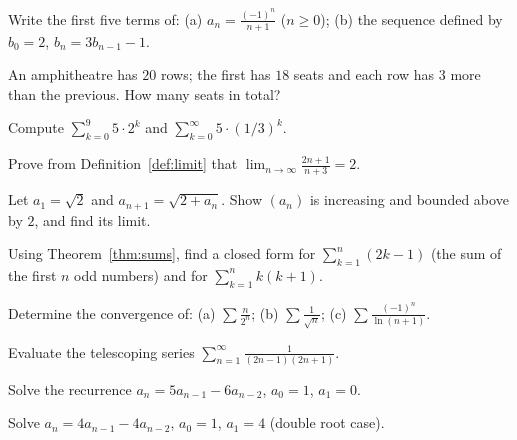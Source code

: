 \begin{exercise}{\easy}
Write the first five terms of: (a) $a_n = \frac{(-1)^n}{n+1}$ ($n \geq 0$);
(b) the sequence defined by $b_0 = 2$, $b_{n} = 3b_{n-1} - 1$.
\end{exercise}

\begin{exercise}{\easy}
An amphitheatre has $20$ rows; the first has $18$ seats and each row has $3$
more than the previous. How many seats in total?
\end{exercise}

\begin{exercise}{\easy}
Compute $\sum_{k=0}^{9} 5 \cdot 2^{k}$ and
$\sum_{k=0}^{\infty} 5 \cdot (1/3)^{k}$.
\end{exercise}

\begin{exercise}{\medium}
Prove from Definition~\ref{def:limit} that
$\lim_{n\to\infty} \frac{2n+1}{n+3} = 2$.
\end{exercise}

\begin{exercise}{\medium}
Let $a_1 = \sqrt2$ and $a_{n+1} = \sqrt{2 + a_n}$. Show $(a_n)$ is
increasing and bounded above by $2$, and find its limit.
\end{exercise}

\begin{exercise}{\medium}
Using Theorem~\ref{thm:sums}, find a closed form for
$\sum_{k=1}^{n} (2k-1)$ (the sum of the first $n$ odd numbers) and for
$\sum_{k=1}^{n} k(k+1)$.
\end{exercise}

\begin{exercise}{\medium}
Determine the convergence of:
(a) $\sum \frac{n}{2^{n}}$;\quad
(b) $\sum \frac{1}{\sqrt n}$;\quad
(c) $\sum \frac{(-1)^{n}}{\ln(n+1)}$.
\end{exercise}

\begin{exercise}{\medium}
Evaluate the telescoping series
$\sum_{n=1}^{\infty} \frac{1}{(2n-1)(2n+1)}$.
\end{exercise}

\begin{exercise}{\medium}
Solve the recurrence $a_n = 5a_{n-1} - 6a_{n-2}$, $a_0 = 1$, $a_1 = 0$.
\end{exercise}

\begin{exercise}{\hard}
Solve $a_n = 4a_{n-1} - 4a_{n-2}$, $a_0 = 1$, $a_1 = 4$ (double root case).
\end{exercise}


